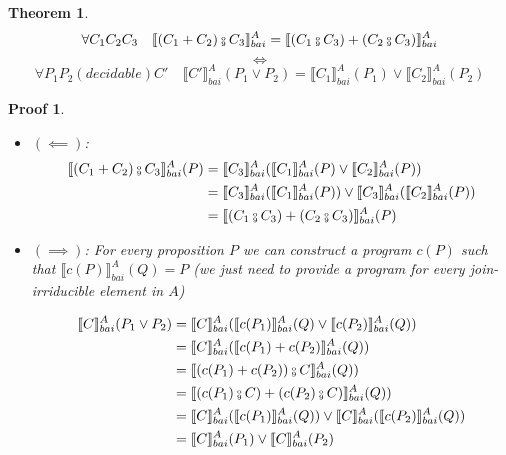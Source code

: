 \documentclass{article}
\newtheorem{theorem}{Theorem}
\newtheorem{proofs}{Proof}
\newcommand*{\sem}[1]{
    \llbracket #1 \rrbracket
}
\newcommand{\bca}[2]{
    #2_{bai}^{#1}
}
\newcommand{\bsem}[2][A]{
    \bca{#1}{\sem{#2}}
}
\def\fcmp{\mathbin{\raise 0.6ex\hbox{\oalign{\hfil$\scriptscriptstyle      
    \mathrm{o}$\hfil\cr\hfil$\scriptscriptstyle\mathrm{9}$\hfil}}}}
\begin{document}
    \begin{theorem}
        $$\forall C_1 C_2 C_3 \quad \bsem{(C_1 + C_2) \fcmp C_3} =
        \bsem{(C_1 \fcmp C_3) + (C_2 \fcmp C_3)}$$
        $$\iff$$ 
        $$\forall P_1 P_2 (decidable) C' \quad
        \bsem{C'}(P_1 \lor P_2) = \bsem{C_1}(P_1) \lor \bsem{C_2}(P_2)$$
    \end{theorem}
    \begin{proofs}
        \begin{itemize}
            \item $(\impliedby)$:
                \begin{align*}
                    \bsem{(C_1 + C_2) \fcmp C_3}(P)
                        &= \bsem{C_3}(\bsem{C_1}(P) \lor \bsem{C_2}(P)) \\
                        &= \bsem{C_3}(\bsem{C_1}(P)) \lor \bsem{C_3}(\bsem{C_2}(P)) \\
                        &= \bsem{(C_1 \fcmp C_3) + (C_2 \fcmp C_3)}(P)
                \end{align*}
            \item $(\implies)$:
                For every proposition $P$ we can construct a program 
                $c(P)$ such that $\bsem{c(P)}(Q) = P$ (we just need to provide
                a program for every join-irriducible element in $A$)

                \begin{align*}
                    \bsem{C}(P_1 \lor P_2)
                        &= \bsem{C}(\bsem{c(P_1)}(Q) \lor \bsem{c(P_2)}(Q)) \\
                        &= \bsem{C}(\bsem{c(P_1) + c(P_2)}(Q)) \\
                        &= \bsem{(c(P_1) + c(P_2)) \fcmp C}(Q)) \\
                        &= \bsem{(c(P_1) \fcmp C) + (c(P_2) \fcmp C)}(Q)) \\
                        &= \bsem{C}(\bsem{c(P_1)}(Q)) \lor \bsem{C}(\bsem{c(P_2)}(Q)) \\
                        &= \bsem{C}(P_1) \lor \bsem{C}(P_2) \\
                \end{align*}
        \end{itemize}
    \end{proofs}
\end{document}
